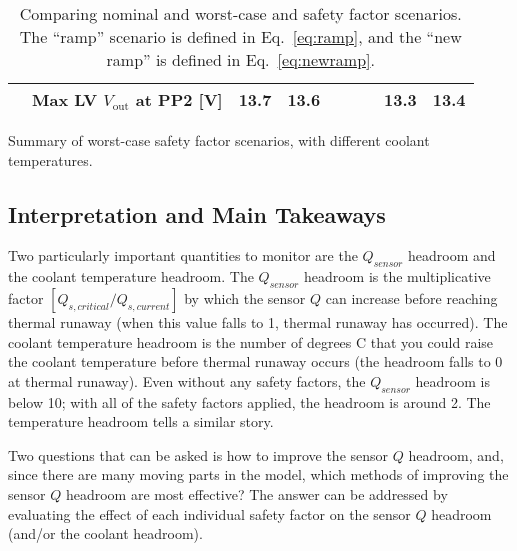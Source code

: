\begin{table}[ht]
\begin{subtable}[t]{.99\linewidth}
\begin{centering}
{\begin{tabular}{|l|l|r|r|r|r|r|r|r|}
                                & Max LV $V_\text{out}$ at PP2 [V]                                      &           13.7 &          13.6 &               &               &               &          13.3 &           13.4 \\
\hline\end{tabular}
} %
\end{centering}
\caption{Summary of worst-case safety factor scenarios, with different coolant temperatures.}
\end{subtable}
\caption{Comparing nominal and worst-case and safety factor scenarios.
The ``ramp'' scenario is defined in Eq.~\ref{eq:ramp}, and the ``new ramp'' is defined in Eq.~\ref{eq:newramp}.
}
\label{results_summary}
\end{table}
\let\arraystretch\arraystretcha

\restoregeometry
\clearpage

\subsection{Interpretation and Main Takeaways}

Two particularly important quantities to monitor are the $Q_{sensor}$ headroom and the coolant
temperature headroom. The $Q_{sensor}$ headroom is the multiplicative factor
$[Q_{s,critical}/Q_{s,current}]$ by which the sensor $Q$ can increase before reaching thermal runaway
(when this value falls to 1, thermal runaway has occurred). The coolant temperature headroom is the
number of degrees C that you could raise the coolant temperature before thermal runaway occurs (the
headroom falls to 0 at thermal runaway). Even without any safety factors, the $Q_{sensor}$ headroom
is below 10; with all of the safety factors applied, the headroom is around 2. The temperature
headroom tells a similar story.

Two questions that can be asked is how to improve the sensor $Q$ headroom, and, since there are many
moving parts in the model, which methods of improving the sensor $Q$ headroom are most effective? The
answer can be addressed by evaluating the effect of each individual safety factor on the sensor $Q$
headroom (and/or the coolant headroom).

